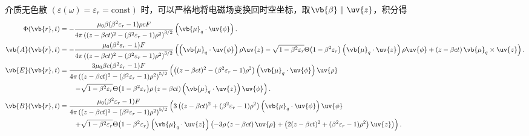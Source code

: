 \begin{exbox}
	介质无色散 \((\varepsilon(\omega) = \varepsilon_{r} = \text{const})\) 时，可以严格地将电磁场变换回时空坐标，取\(\vb{\beta}\parallel\uv{z}\)，积分得
	\begin{align*}
		\Phi(\vb{r}, t) &= -\frac{\mu_{0} \beta (\beta^{2} \varepsilon_{r} - 1) \rho c F}{4\pi \left( (z - \beta c t)^{2} - (\beta^{2} \varepsilon_{r} - 1) \rho^{2} \right)^{3/2}} \left( \vb{\mu}_{q} \cdot \uv{\phi} \right) . \\
		\vb{A}(\vb{r}, t) &= -\frac{\mu_{0} (\beta^{2} \varepsilon_{r} - 1)F}{4\pi \left( (z - \beta c t)^{2} - (\beta^{2} \varepsilon_{r} - 1) \rho^{2} \right)^{3/2}} \left( \left( \vb{\mu}_{q} \cdot \uv{\phi} \right) \rho \uv{z} - \sqrt{1 - \beta^{2} \varepsilon_{r}} \Theta\bigl(1 - \beta^{2} \varepsilon_{r}\bigr) \left( \vb{\mu}_{q} \cdot \uv{z} \right) \rho \uv{\phi} + \left( z - \beta c t \right) \vb{\mu}_{q} \times \uv{z} \right). \\
		\vb{E}(\vb{r}, t) &= \frac{3\mu_{0} \beta c (\beta^{2} \varepsilon_{r} - 1) F }{4\pi \left( (z - \beta c t)^{2} - (\beta^{2} \varepsilon_{r} - 1) \rho^{2} \right)^{5/2}} \left( \left( (z - \beta c t)^{2} - (\beta^{2} \varepsilon_{r} - 1) \rho^{2} \right) \left( \vb{\mu}_{q} \cdot \uv{\phi} \right) \uv{\rho} \right.\\
		&\quad\quad\left. - \sqrt{1 - \beta^{2} \varepsilon_{r}} \Theta\bigl(1 - \beta^{2} \varepsilon_{r}\bigr) \rho \left( z - \beta c t \right) \left( \vb{\mu}_{q} \cdot \uv{z} \right) \uv{\phi} \right). \\
		\vb{B}(\vb{r}, t) &= \frac{\mu_{0} (\beta^{2} \varepsilon_{r} - 1) F }{4\pi \left( (z - \beta c t)^{2} - (\beta^{2} \varepsilon_{r} - 1) \rho^{2} \right)^{5/2}} \left( 3 \left( (z - \beta c t)^{2} + (\beta^{2} \varepsilon_{r} - 1) \rho^{2} \right) \left( \vb{\mu}_{q} \cdot \uv{\phi} \right) \uv{\phi} \right.\\
		&\quad\quad\left. + \sqrt{1 - \beta^{2} \varepsilon_{r}} \Theta\bigl(1 - \beta^{2} \varepsilon_{r}\bigr) \left( \vb{\mu}_{q} \cdot \uv{z} \right) \left( -3 \rho \left( z - \beta c t \right) \uv{\rho} + \left( 2 (z - \beta c t)^{2} + (\beta^{2} \varepsilon_{r} - 1) \rho^{2} \right) \uv{z} \right) \right).
	\end{align*}
\end{exbox}
